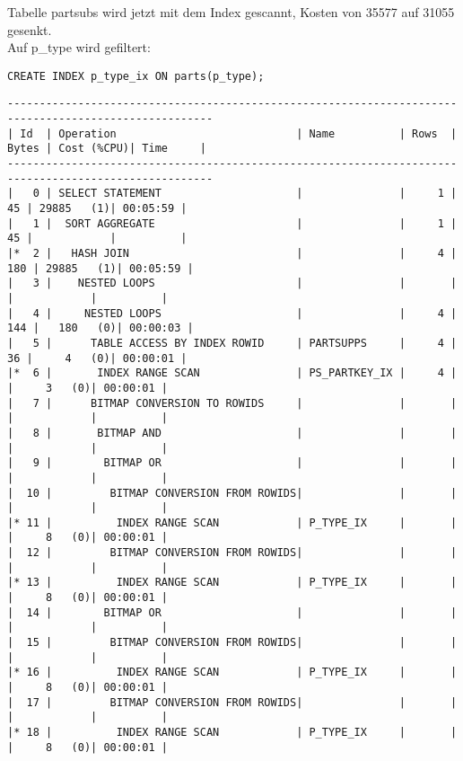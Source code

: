 \documentclass[10pt]{article}
\begin{document}
Tabelle partsubs wird jetzt mit dem Index gescannt, Kosten von 35577 auf 31055 gesenkt. \\ 
Auf p\_type wird gefiltert:
\begin{lstlisting}[style=sql]
CREATE INDEX p_type_ix ON parts(p_type);
\end{lstlisting}
\begin{lstlisting}[style=queryexecutionplan]
------------------------------------------------------------------------------------------------------
| Id  | Operation                            | Name          | Rows  | Bytes | Cost (%CPU)| Time     |
------------------------------------------------------------------------------------------------------
|   0 | SELECT STATEMENT                     |               |     1 |    45 | 29885   (1)| 00:05:59 |
|   1 |  SORT AGGREGATE                      |               |     1 |    45 |            |          |
|*  2 |   HASH JOIN                          |               |     4 |   180 | 29885   (1)| 00:05:59 |
|   3 |    NESTED LOOPS                      |               |       |       |            |          |
|   4 |     NESTED LOOPS                     |               |     4 |   144 |   180   (0)| 00:00:03 |
|   5 |      TABLE ACCESS BY INDEX ROWID     | PARTSUPPS     |     4 |    36 |     4   (0)| 00:00:01 |
|*  6 |       INDEX RANGE SCAN               | PS_PARTKEY_IX |     4 |       |     3   (0)| 00:00:01 |
|   7 |      BITMAP CONVERSION TO ROWIDS     |               |       |       |            |          |
|   8 |       BITMAP AND                     |               |       |       |            |          |
|   9 |        BITMAP OR                     |               |       |       |            |          |
|  10 |         BITMAP CONVERSION FROM ROWIDS|               |       |       |            |          |
|* 11 |          INDEX RANGE SCAN            | P_TYPE_IX     |       |       |     8   (0)| 00:00:01 |
|  12 |         BITMAP CONVERSION FROM ROWIDS|               |       |       |            |          |
|* 13 |          INDEX RANGE SCAN            | P_TYPE_IX     |       |       |     8   (0)| 00:00:01 |
|  14 |        BITMAP OR                     |               |       |       |            |          |
|  15 |         BITMAP CONVERSION FROM ROWIDS|               |       |       |            |          |
|* 16 |          INDEX RANGE SCAN            | P_TYPE_IX     |       |       |     8   (0)| 00:00:01 |
|  17 |         BITMAP CONVERSION FROM ROWIDS|               |       |       |            |          |
|* 18 |          INDEX RANGE SCAN            | P_TYPE_IX     |       |       |     8   (0)| 00:00:01 |

\end{lstlisting}
\end{document}
